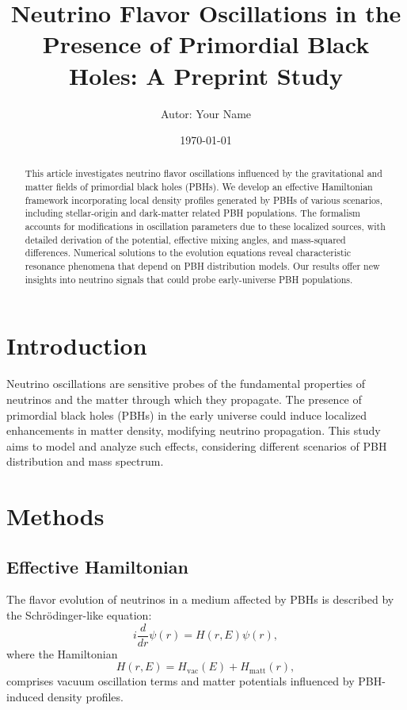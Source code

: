 \documentclass[a4paper,11pt]{article}
\title{Neutrino Flavor Oscillations in the Presence of Primordial Black Holes: A Preprint Study}
\author{Autor: Your Name}
\date{\today}
\begin{document}
\maketitle

\begin{abstract}
This article investigates neutrino flavor oscillations influenced by the gravitational and matter fields of primordial black holes (PBHs). We develop an effective Hamiltonian framework incorporating local density profiles generated by PBHs of various scenarios, including stellar-origin and dark-matter related PBH populations. The formalism accounts for modifications in oscillation parameters due to these localized sources, with detailed derivation of the potential, effective mixing angles, and mass-squared differences. Numerical solutions to the evolution equations reveal characteristic resonance phenomena that depend on PBH distribution models. Our results offer new insights into neutrino signals that could probe early-universe PBH populations.
\end{abstract}

\section{Introduction}
Neutrino oscillations are sensitive probes of the fundamental properties of neutrinos and the matter through which they propagate. The presence of primordial black holes (PBHs) in the early universe could induce localized enhancements in matter density, modifying neutrino propagation. This study aims to model and analyze such effects, considering different scenarios of PBH distribution and mass spectrum.

\section{Methods}
\subsection{Effective Hamiltonian}
The flavor evolution of neutrinos in a medium affected by PBHs is described by the Schrödinger-like equation:
\begin{equation}
i \frac{d}{dr} \psi(r) = H(r, E) \psi(r),
\end{equation}
where the Hamiltonian
\begin{equation}
H(r, E) = H_\mathrm{vac}(E) + H_\mathrm{matt}(r),
\end{equation}
comprises vacuum oscillation terms and matter potentials influenced by PBH-induced density profiles.
\end{document}
